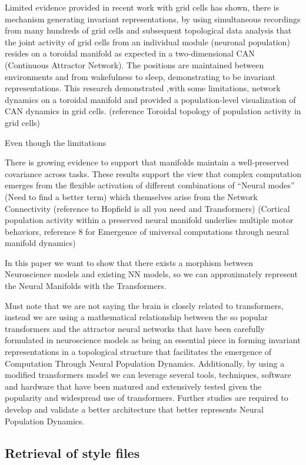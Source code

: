 \documentclass{article}
\begin{document}
Limited evidence provided in recent work with grid cells has shown, there is mechanism generating invariant representations, by using simultaneous recordings from many hundreds of grid cells and subsequent topological data analysis that the joint activity of grid cells from an individual module (neuronal population) resides on a toroidal manifold as expected in a two-dimensional CAN (Continuous Attractor Network). The positions are maintained between environments and from wakefulness to sleep, demonstrating to be invariant representations. This research demonstrated ,with some limitations, network dynamics on a toroidal manifold and provided a population-level visualization of CAN dynamics in grid cells.
(reference Toroidal topology of population activity in grid cells)

Even though the limitations 

There is growing evidence to support that manifolds maintain a well-preserved covariance across tasks. These results support the view that complex computation emerges from the flexible activation of different combinations of “Neural modes” (Need to find a better term) which themselves arise from the Network Connectivity (reference to Hopfield is all you need and Transformers) (Cortical population activity within a preserved neural manifold underlies multiple motor behaviors, reference 8 for Emergence of universal computations through neural manifold dynamics)

In this paper we want to show that there exists a morphism between Neuroscience models and existing NN models, so we can approximately represent the Neural Manifolds with the Transformers.

Must note that we are not saying the brain is closely related to transformers, instead we are  using a mathematical relationship between the so popular transformers and the attractor neural networks that have been carefully formulated in neuroscience models as being an essential piece in forming invariant representations in a topological structure that facilitates the emergence of Computation Through Neural Population Dynamics.
Additionally, by using a modified transformers model we can leverage several tools, techniques, software and hardware that have been matured and extensively tested given the popularity and widespread use of transformers. Further studies are required to develop and validate a better architecture that better represents Neural Population Dynamics.



\subsection{Retrieval of style files}
\end{document}
